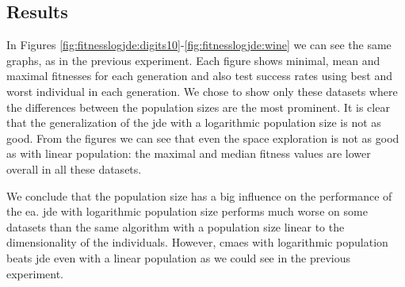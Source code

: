 \documentclass[12pt,a4paper]{report}
\begin{document}
\subsection{Results}

In Figures \ref{fig:fitnesslogjde:digits10}-\ref{fig:fitnesslogjde:wine} we can see the same graphs, as in the previous experiment. Each figure shows minimal, mean and maximal fitnesses for each generation and also test success rates using best and worst individual in each generation. We chose to show only these datasets where the differences between the population sizes are the most prominent. It is clear that the generalization of the \ac{jde} with a logarithmic population size is not as good. From the figures we can see that even the space exploration is not as good as with linear population: the maximal and median fitness values are lower overall in all these datasets.

We conclude that the population size has a big influence on the performance of the \acl{ea}. \ac{jde} with logarithmic population size performs much worse on some datasets than the same algorithm with a population size linear to the dimensionality of the individuals. However, \ac{cmaes} with logarithmic population beats \ac{jde} even with a linear population as we could see in the previous experiment.

\end{document}
